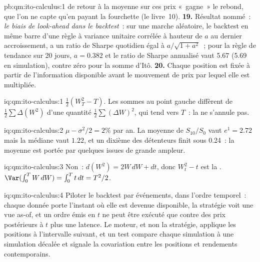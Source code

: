 \begin{solution}{pb:qm:ito-calculus:1}
de retour à la moyenne sur ces prix «~gagne~» le rebond, que l'on ne capte qu'en payant la fourchette
(le livre~10).
\textbf{19.} Résultat nommé~: \emph{le biais de look-ahead dans le backtest}~: sur une marche aléatoire, le backtest en même barre
d'une règle à variance unitaire corrélée à hauteur de $a$ au dernier accroissement, a un ratio de Sharpe quotidien
égal à $a/\sqrt{1 + a^2}$~; pour la règle de tendance sur 20 jours, $a = 0.382$ et le ratio de Sharpe annualisé vaut 5.67
(5.69 en simulation), contre zéro pour la somme d'Itô.
\textbf{20.} Chaque position est fixée à partir de l'information disponible avant le mouvement de prix
par lequel elle est multipliée.
\end{solution}

\begin{solution}{iq:qm:ito-calculus:1}
$\tfrac12(W_T^2 - T)$. Les sommes au point gauche diffèrent de $\tfrac12\sum\Delta(W^2)$ d'une quantité $\tfrac12\sum(\Delta W)^2$,
qui tend vers $T$~: la  ne s'annule pas.
\end{solution}

\begin{solution}{iq:qm:ito-calculus:2}
$\mu - \sigma^2/2 = 2\%$ par an. La moyenne de $S_{10}/S_0$ vaut $e^{1} = 2.72$ mais la médiane vaut $1.22$, et un
dixième des détenteurs finit sous 0.24~: la moyenne est portée par quelques issues de grande ampleur.
\end{solution}

\begin{solution}{iq:qm:ito-calculus:3}
Non~: $d(W^2) = 2W\,dW + dt$, donc $W_t^2 - t$ est la . $\Var(\int_0^TW\,dW) = \int_0^Tt\,dt =
T^2/2$.
\end{solution}

\begin{solution}{iq:qm:ito-calculus:4}
Piloter le backtest par événements, dans l'ordre temporel~: chaque donnée porte l'instant où elle est devenue disponible, la
stratégie voit une vue as-of, et un ordre émis en $t$ ne peut être exécuté que contre des prix postérieurs à
$t$ plus une latence. Le moteur, et non la stratégie, applique les positions à l'intervalle suivant, et
un test compare chaque simulation à une simulation décalée et signale la covariation entre les positions et
rendements contemporains.
\end{solution}

